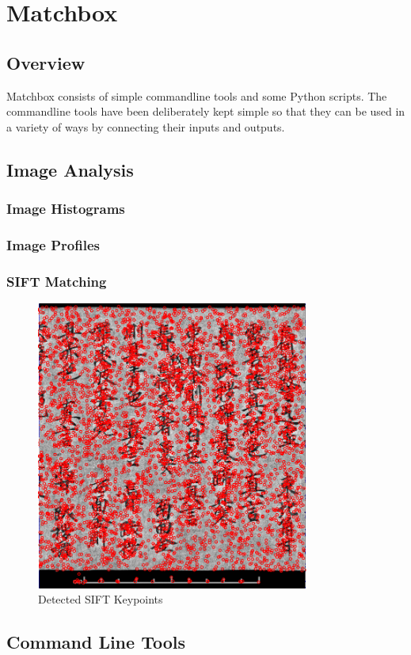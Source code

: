 \section{Matchbox}

\subsection{Overview}

Matchbox consists of simple commandline tools and some Python scripts.
The commandline tools have been deliberately kept simple so that they 
can be used in a variety of ways by connecting their inputs and outputs.

\subsection{Image Analysis}

\subsubsection{Image Histograms}

\subsubsection{Image Profiles}

\subsubsection{SIFT Matching}


\begin{figure}
	\centering
		\includegraphics[width=0.80\textwidth]{img/BLX2444_OR8210S5621R1_5_R_all_keypoints.png}
	\caption{Detected SIFT Keypoints}
	\label{fig:BLX2444_OR8210S5621R1_5_R_all_keypoints}
\end{figure}




\subsection{Command Line Tools}





